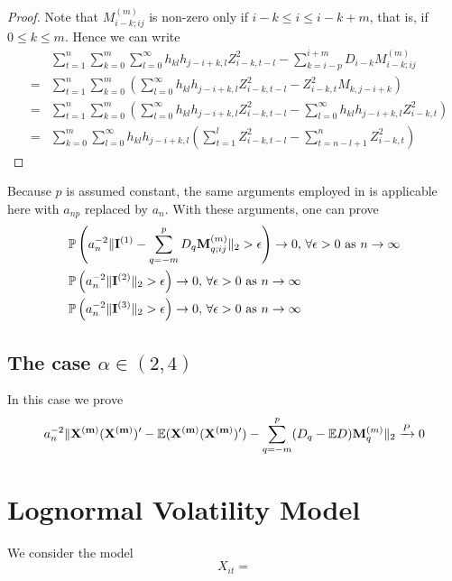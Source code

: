 \documentclass{article}
\begin{document}
\begin{proof}
  Note that $M_{i-k; ij}^{(m)}$ is non-zero only if $i-k \leq i \leq
  i-k+m$, that is, if $0 \leq k \leq m$. Hence we can write
  \begin{eqnarray*}
    && \sum_{t=1}^n \sum_{k=0}^m \sum_{l=0}^\infty h_{kl}h_{j-i+k,l}
    Z_{i-k, t-l}^2 - \sum_{k=i-p}^{i+m} D_{i-k} M_{i-k; ij}^{(m)} \\
    &=& \sum_{t=1}^n \sum_{k=0}^m \left(
      \sum_{l=0}^\infty h_{kl}h_{j-i+k,l} Z_{i-k, t-l}^2 - Z_{i-k, t}^2 M_{k,
        j-i+k} \right) \\
    &=& \sum_{t=1}^n \sum_{k=0}^m \left(
      \sum_{l=0}^\infty h_{kl}h_{j-i+k,l} Z_{i-k, t-l}^2 - \sum_{l=0}^{\infty}
      h_{kl} h_{j-i+k, l} Z_{i-k, t}^2  \right) \\
    &=& \sum_{k=0}^m \sum_{l=0}^\infty h_{kl} h_{j-i+k, l}\left(
      \sum_{t=1}^l Z_{i-k, t-l}^2 - \sum_{t=n-l+1}^n Z_{i-k, t}^2
    \right)
  \end{eqnarray*}
\end{proof}
Because $p$ is assumed constant, the same arguments employed in
\cite{Mikosch2014} is applicable here with $a_{np}$ replaced by
$a_n$. With these arguments, one can prove
\begin{eqnarray*}
  &\mathbb{P}\left( a_n^{-2} \|\mathbf{I}^{(1)} - \sum_{q=-m}^p D_q \mathbf{M}_{q;
      ij}^{(m)} \|_2 > \epsilon \right) \to 0 \text{, $\forall \epsilon > 0$
    as } n \to \infty \\
  & \mathbb{P}\left(
    a_n^{-2} \|\mathbf{I}^{(2)}\|_2 > \epsilon
  \right) \to 0 \text{, } \forall \epsilon > 0 \text{ as } n \to
  \infty \\
  & \mathbb{P}\left(
    a_n^{-2} \|\mathbf{I}^{(3)}\|_2 > \epsilon
  \right) \to 0 \text{, } \forall \epsilon > 0 \text{ as } n \to \infty
\end{eqnarray*}

\subsection[alpha in (2,4)]{The case $\alpha \in (2,4)$}
In this case we prove
\[
a_n^{-2} \|\mathbf{X^{(m)} (X^{(m)})'} - \mathbb{E}(\mathbf{X^{(m)} (X^{(m)})'}) -
\sum_{q=-m}^p (D_q - \mathbb{E} D) \mathbf{M}_q^{(m)}\|_2
\xrightarrow{P} 0
\]


\section{Lognormal Volatility Model}
We consider the model
\[
X_{it} = 
\]


\end{document}
